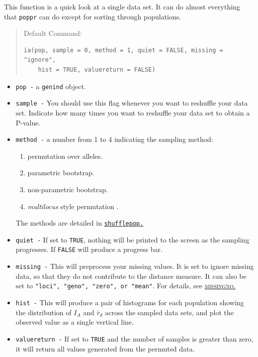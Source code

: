 \documentclass[letterpaper]{article}\usepackage[]{graphicx}\usepackage[]{color}
\makeatletter
\newenvironment{kframe}{%
 \def\at@end@of@kframe{}%
 \ifinner\ifhmode%
  \def\at@end@of@kframe{\end{minipage}}%
  \begin{minipage}{\columnwidth}%
 \fi\fi%
 \def\FrameCommand##1{\hskip\@totalleftmargin \hskip-\fboxsep
 \colorbox{shadecolor}{##1}\hskip-\fboxsep
     \hskip-\linewidth \hskip-\@totalleftmargin \hskip\columnwidth}%
 \MakeFramed {\advance\hsize-\width
   \@totalleftmargin\z@ \linewidth\hsize
   \@setminipage}}%
 {\par\unskip\endMakeFramed%
 \at@end@of@kframe}
\newenvironment{knitrout}{}{} %
\newcommand{\tab}{\hspace*{1em}}
\newcommand{\cmdlink}[2]{
  \texttt{\hyperref[#1]{#2}}
}
\newcommand{\seclink}[2]{
  \textsc{\hyperref[#1]{#2}}
}
\makeatother
\begin{document}
\tab\tab This function is a quick look at a single data set. It can do almost everything that \texttt{poppr} can do except for sorting through populations.
\begin{quote}
Default Command:
\begin{knitrout}
\color{fgcolor}\begin{kframe}
\begin{verbatim}
ia(pop, sample = 0, method = 1, quiet = FALSE, missing = "ignore", 
    hist = TRUE, valuereturn = FALSE)
\end{verbatim}
\end{kframe}
\end{knitrout}

\end{quote}
\begin{itemize}
  \item \texttt{pop -} a \texttt{genind} object.
  \item \texttt{sample -} You should use this flag whenever you want to reshuffle your data set. Indicate how many times you want to reshuffle your data set to obtain a P-value. 
  \item \texttt{method -} a number from 1 to 4 indicating the sampling method:
  \begin{enumerate}
    \item permutation over alleles.
    \item parametric bootstrap.
    \item non-parametric bootstrap.
    \item \textit{multilocus} style permutation \cite{Agapow:2001}.
  \end{enumerate}
  The methods are detailed in\cmdlink{data.manip:shuffle:shufflepop}{shufflepop.}
  \item \texttt{quiet -} If set to \texttt{TRUE}, nothing will be printed to the screen as the sampling progresses. If \texttt{FALSE} will produce a progress bar.
  \item \texttt{missing -} This will preprocess your missing values. It is set to ignore missing data, so that they do not contribute to the distance measure. It can also be set to \texttt{"loci", "geno", "zero", or "mean"}. For details, see\seclink{data.manip:missing:missingno}{missingno.}
  \item \texttt{hist -} This will produce a pair of histograms for each population showing the distribution of $I_A$ and $\bar r_d$ across the sampled data sets, and plot the observed value as a single vertical line.
  \item \texttt{valuereturn -} If set to \texttt{TRUE} and the number of samples
  is greater than zero, it will return all values generated from the permuted
  data. 
\end{itemize}
\end{document}

